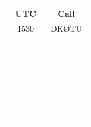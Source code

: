 \documentclass[a4paper,10pt]{article}
\begin{document}
  \bigskip
  \begin{minipage}[t]{0.5\textwidth}
  \begin{center}
  \renewcommand{\arraystretch}{1.5}
  \begin{tabular}{|c|c|}\hline
      \textbf{UTC} & \textbf{Call} \\ \hline \hline
       ~~1530~~ & DKØTU \\ \hline
       \hspace{2cm} & \hspace{3.0cm} \\ \hline
       & \\ \hline
       & \\ \hline
       & \\ \hline
       & \\ \hline
       & \\ \hline
       & \\ \hline
       & \\ \hline
       & \\ \hline
       & \\ \hline
       & \\ \hline
       & \\ \hline
       & \\ \hline
       & \\ \hline
       & \\ \hline
       & \\ \hline
       & \\ \hline
       & \\ \hline
       & \\ \hline
       & \\ \hline
       & \\ \hline
       & \\ \hline
       & \\ \hline
       & \\ \hline
       & \\ \hline
       & \\ \hline
       & \\ \hline
  \end{tabular}
  \end{center}
  \end{minipage}
  \hfill
\end{document}
